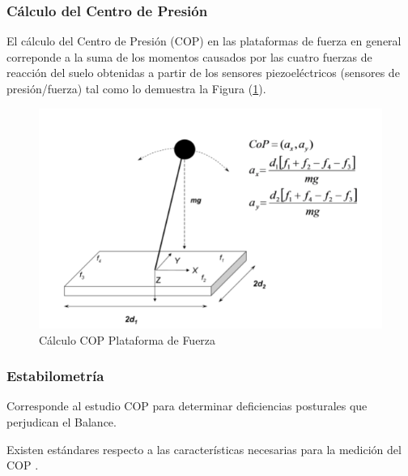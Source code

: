 \documentclass[12pt,a4paper]{article}
\begin{document}
\subsubsection{Cálculo del Centro de Presión}
El cálculo del Centro de Presión (COP) en las plataformas de fuerza en general correponde a la suma de los momentos causados por las cuatro fuerzas de reacción del suelo obtenidas a partir de los sensores piezoeléctricos (sensores de presión/fuerza) tal como lo demuestra la Figura (\ref{fig:calculoCOP}).

\begin{figure}[H]
	\centering
	\includegraphics[width=0.65\linewidth]{images/calculoCOP}
	\caption{Cálculo COP Plataforma de Fuerza}
	\label{fig:calculoCOP}
\end{figure}

\subsubsection{Estabilometría}
Corresponde al estudio COP para determinar deficiencias posturales que perjudican el Balance.

Existen estándares respecto a las características necesarias para la medición del COP \cite{scoppa_clinical_2013}.
\end{document}
